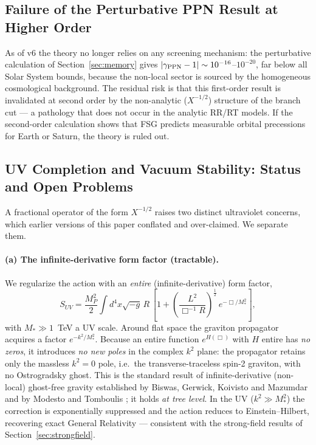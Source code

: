 \documentclass[11pt,a4paper]{article}
\begin{document}
\begin{onehalfspacing}
\subsection{Failure of the Perturbative PPN Result at Higher Order}
As of v6 the theory no longer relies on any screening mechanism: the perturbative calculation of Section~\ref{sec:memory} gives $|\gamma_{\rm PPN}-1| \sim 10^{-16}$--$10^{-20}$, far below all Solar System bounds, because the non-local sector is sourced by the homogeneous cosmological background. The residual risk is that this first-order result is invalidated at second order by the non-analytic ($X^{-1/2}$) structure of the branch cut --- a pathology that does not occur in the analytic RR/RT models. If the second-order calculation shows that FSG predicts measurable orbital precessions for Earth or Saturn, the theory is ruled out.
\subsection{UV Completion and Vacuum Stability: Status and Open Problems}
\label{sec:uv}
A fractional operator of the form $X^{-1/2}$ raises two distinct ultraviolet concerns, which earlier versions of this paper conflated and over-claimed. We separate them.
\paragraph{(a) The infinite-derivative form factor (tractable).}
We regularize the action with an \emph{entire} (infinite-derivative) form factor,
\begin{equation}
S_{UV} = \frac{M_P^2}{2} \int d^4x \sqrt{-g} \, R \, \left[ 1 + \left(\frac{L^2}{\Box^{-1}R}\right)^{\frac{1}{2}}\, e^{-\Box / M_*^2} \right],
\label{eq:regularized_action}
\end{equation}
with $M_* \gg 1$~TeV a UV scale. Around flat space the graviton propagator acquires a factor $e^{-k^2/M_*^2}$. Because an entire function $e^{H(\Box)}$ with $H$ entire has \emph{no zeros}, it introduces \emph{no new poles} in the complex $k^2$ plane: the propagator retains only the massless $k^2=0$ pole, i.e.\ the transverse-traceless spin-2 graviton, with no Ostrogradsky ghost. This is the standard result of infinite-derivative (non-local) ghost-free gravity established by Biswas, Gerwick, Koivisto and Mazumdar \cite{Biswas2012} and by Modesto and Tomboulis \cite{Modesto2012,Tomboulis1997}; it holds \emph{at tree level}. In the UV ($k^2 \gg M_*^2$) the correction is exponentially suppressed and the action reduces to Einstein--Hilbert, recovering exact General Relativity --- consistent with the strong-field results of Section~\ref{sec:strongfield}.

\end{onehalfspacing}
\end{document}
